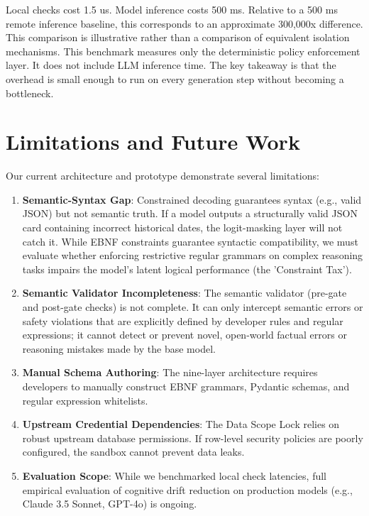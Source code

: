 \documentclass[10pt,journal,compsoc]{IEEEtran}
\begin{document}
Local checks cost 1.5 us. Model inference costs 500 ms. Relative to a 500 ms remote inference baseline, this corresponds to an approximate 300,000x difference. This comparison is illustrative rather than a comparison of equivalent isolation mechanisms. This benchmark measures only the deterministic policy enforcement layer. It does not include LLM inference time. The key takeaway is that the overhead is small enough to run on every generation step without becoming a bottleneck.


\section{Limitations and Future Work}
\label{sec:limitations}
Our current architecture and prototype demonstrate several limitations:
\begin{enumerate}
  \item \textbf{Semantic-Syntax Gap}: Constrained decoding guarantees syntax (e.g., valid JSON) but not semantic truth. If a model outputs a structurally valid JSON card containing incorrect historical dates, the logit-masking layer will not catch it. While EBNF constraints guarantee syntactic compatibility, we must evaluate whether enforcing restrictive regular grammars on complex reasoning tasks impairs the model's latent logical performance (the 'Constraint Tax').
  \item \textbf{Semantic Validator Incompleteness}: The semantic validator (pre-gate and post-gate checks) is not complete. It can only intercept semantic errors or safety violations that are explicitly defined by developer rules and regular expressions; it cannot detect or prevent novel, open-world factual errors or reasoning mistakes made by the base model.
  \item \textbf{Manual Schema Authoring}: The nine-layer architecture requires developers to manually construct EBNF grammars, Pydantic schemas, and regular expression whitelists.
  \item \textbf{Upstream Credential Dependencies}: The Data Scope Lock relies on robust upstream database permissions. If row-level security policies are poorly configured, the sandbox cannot prevent data leaks.
  \item \textbf{Evaluation Scope}: While we benchmarked local check latencies, full empirical evaluation of cognitive drift reduction on production models (e.g., Claude 3.5 Sonnet, GPT-4o) is ongoing.
\end{enumerate}
\end{document}
